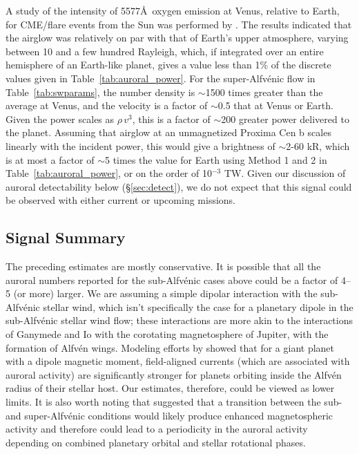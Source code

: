 \documentclass{emulateapj}
\newcommand{\XXX}[1]{#1}      %
\begin{document}
\XXX{A study of the intensity of 5577\AA\ oxygen emission at Venus, relative to Earth, for CME/flare events from the Sun was performed by \citet{Gray2014}. The results indicated that the airglow was relatively on par with that of Earth's upper atmosphere, varying between 10 and a few hundred Rayleigh, which, if integrated over an entire hemisphere of an Earth-like planet, gives a value less than 1\% of the discrete values given in Table~\ref{tab:auroral_power}. For the super-Alfv\'{e}nic flow in Table~\ref{tab:swparams}, the number density is $\sim$1500 times greater than the average at Venus, and the velocity is a factor of $\sim$0.5 that at Venus or Earth. Given the power scales as $\rho\,v^3$, this is a factor of $\sim$200 greater power delivered to the planet. Assuming that airglow at an unmagnetized Proxima Cen b scales linearly with the incident power, this would give a brightness of $\sim$2-60 kR, which is at most a factor of $\sim$5 times the value for Earth using Method 1 and 2 in Table~\ref{tab:auroral_power}, or on the order of 10$^{-3}$ TW.  Given our discussion of auroral detectability below (\S\ref{sec:detect}), we do not expect that this signal could be observed with either current or upcoming missions.}

\subsection{Signal Summary}
\label{sec:signal_summary}

The preceding estimates are mostly conservative.  It is possible that all the auroral numbers reported for the sub-Alfv\'{e}nic cases above could be a factor of 4--5 (or more) larger. \XXX{We are assuming a simple dipolar interaction with the sub-Alfv\'{e}nic stellar wind, which isn't specifically the case for a planetary dipole in the sub-Alfv\'{e}nic stellar wind flow}; these interactions are more akin to the interactions of Ganymede and Io with the corotating magnetosphere of Jupiter, with the formation of Alfv\'{e}n wings. Modeling efforts by \citet{Preusse2007} showed that for a giant planet with a dipole magnetic moment, field-aligned currents (which are associated with auroral activity) are significantly stronger for planets orbiting inside the Alfv\'{e}n radius of their stellar host. Our estimates, therefore, could be viewed as lower limits. It is also worth noting that \citet{Cohen2014} suggested that a transition between the sub- and super-Alfv\'{e}nic conditions would likely produce enhanced magnetospheric activity and therefore could lead to a periodicity in the auroral activity depending on combined planetary orbital and stellar rotational phases. 
\end{document}
